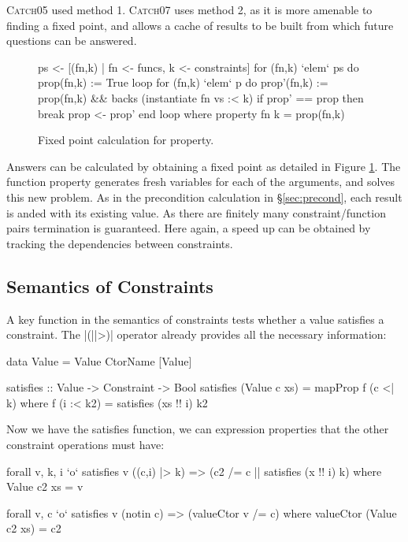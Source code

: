 \documentclass[preprint]{sigplanconf}
\newcommand{\C}[1]{\textsf{#1}}
\newcommand{\catch}{\textsc{Catch}}
\begin{document}
\catch05 used method 1. \catch07 uses method 2, as it is more amenable to finding a fixed point, and allows a cache of results to be built from which future questions can be answered.

\begin{figure}
\begin{code}
ps <- [(fn,k) | fn <- funcs, k <- constraints]
for (fn,k) `elem` ps do prop(fn,k) := True
loop
    for (fn,k) `elem` p do
        prop'(fn,k) := prop(fn,k) && backs (instantiate fn vs :< k)
    if prop' == prop then break
    prop <- prop'
end loop
    where
        property fn k = prop(fn,k)
\end{code}
\caption{Fixed point calculation for \C{property}.}
\label{fig:property_fixp}
\end{figure}

Answers can be calculated by obtaining a fixed point as detailed in Figure \ref{fig:property_fixp}. The function \C{property} generates fresh variables for each of the arguments, and solves this new problem. As in the precondition calculation in \S\ref{sec:precond}, each result is anded with its existing value. As there are finitely many constraint/function pairs termination is guaranteed. Here again, a speed up can be obtained by tracking the dependencies between constraints.

\subsection{Semantics of Constraints}

A key function in the semantics of constraints tests whether a value satisfies a constraint. The |(||>)| operator already provides all the necessary information:

\begin{code}
data Value = Value CtorName [Value]

satisfies :: Value -> Constraint -> Bool
satisfies (Value c xs) = mapProp f (c <| k)
    where f (i :< k2) = satisfies (xs !! i) k2
\end{code}

Now we have the \C{satisfies} function, we can expression properties that the other constraint operations must have:

\begin{code}
forall v, k, i  `o` satisfies v ((c,i) |> k)
                => (c2 /= c || satisfies (x !! i) k)
    where Value c2 xs = v

forall v, c `o` satisfies v (notin c) => (valueCtor v /= c)
    where valueCtor (Value c2 xs) = c2
\end{code}
\end{document}
